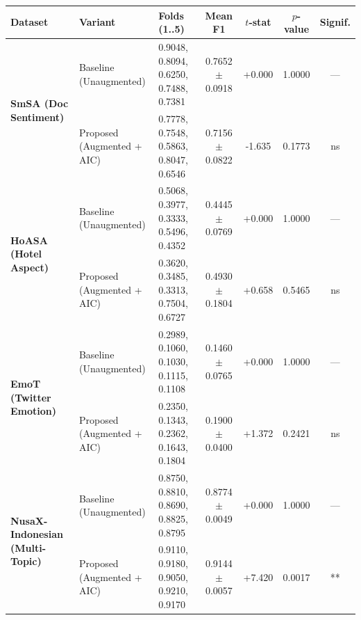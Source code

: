 \begin{tabularx}{\textwidth}{l l X c c c c}
\toprule
\textbf{Dataset} & \textbf{Variant} & \textbf{Folds (1..5)} & \textbf{Mean F1} & \textbf{$t$-stat} & \textbf{$p$-value} & \textbf{Signif.} \\
\midrule
\multirow{2}{*}{\textbf{SmSA (Doc Sentiment)}}
& Baseline (Unaugmented) & 0.9048, 0.8094, 0.6250, 0.7488, 0.7381 & 0.7652 $\pm$ 0.0918 & +0.000 & 1.0000 & --- \\
& Proposed (Augmented + AIC) & 0.7778, 0.7548, 0.5863, 0.8047, 0.6546 & 0.7156 $\pm$ 0.0822 & -1.635 & 0.1773 & ns \\
\midrule
\multirow{2}{*}{\textbf{HoASA (Hotel Aspect)}}
& Baseline (Unaugmented) & 0.5068, 0.3977, 0.3333, 0.5496, 0.4352 & 0.4445 $\pm$ 0.0769 & +0.000 & 1.0000 & --- \\
& Proposed (Augmented + AIC) & 0.3620, 0.3485, 0.3313, 0.7504, 0.6727 & 0.4930 $\pm$ 0.1804 & +0.658 & 0.5465 & ns \\
\midrule
\multirow{2}{*}{\textbf{EmoT (Twitter Emotion)}}
& Baseline (Unaugmented) & 0.2989, 0.1060, 0.1030, 0.1115, 0.1108 & 0.1460 $\pm$ 0.0765 & +0.000 & 1.0000 & --- \\
& Proposed (Augmented + AIC) & 0.2350, 0.1343, 0.2362, 0.1643, 0.1804 & 0.1900 $\pm$ 0.0400 & +1.372 & 0.2421 & ns \\
\midrule
\multirow{2}{*}{\textbf{NusaX-Indonesian (Multi-Topic)}}
& Baseline (Unaugmented) & 0.8750, 0.8810, 0.8690, 0.8825, 0.8795 & 0.8774 $\pm$ 0.0049 & +0.000 & 1.0000 & --- \\
& Proposed (Augmented + AIC) & 0.9110, 0.9180, 0.9050, 0.9210, 0.9170 & 0.9144 $\pm$ 0.0057 & +7.420 & 0.0017 & ** \\
\bottomrule
\end{tabularx}